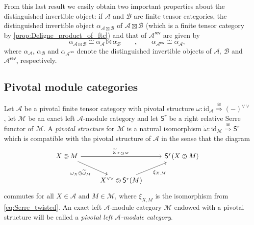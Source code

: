 \documentclass[11pt]{article}
\theoremstyle{definition}
\begin{document}
From this last result we easily obtain two important properties about the distinguished invertible object: if $\mathcal{A}$ and $\mathcal{B}$ are finite tensor categories, the distinguished invertible object $\alpha_{\mathcal{A} \boxtimes \mathcal{B}}$ of $\mathcal{A} \boxtimes \mathcal{B}$ (which is a finite tensor category by \cref{prop:Deligne_product_of_ftc}) and that of $\mathcal{A}^\mathsf{rev}$ are given by 
\begin{equation}\label{eq:disting_inv_for_Deligne_product}
\alpha_{\mathcal{A} \boxtimes \mathcal{B}} \cong \alpha_\mathcal{A} \boxtimes \alpha_\mathcal{B} \qquad , \qquad \alpha_{\mathcal{A}^\mathsf{rev}} \cong \alpha_\mathcal{A},
\end{equation}
where $\alpha_\mathcal{A}$, $\alpha_\mathcal{B}$ and $\alpha_{\mathcal{A}^\mathsf{rev}}$ denote the distinguished invertible objects of $\mathcal{A}$, $\mathcal{B}$ and  $\mathcal{A}^\mathsf{rev}$, respectively.


\subsection{Pivotal module categories}

Let $\mathcal{A}$ be a pivotal finite tensor category with pivotal structure $\omega: \mathrm{id}_\mathcal{A} \overset{\cong}{\Longrightarrow} (-)^{\vee \vee}$, let $\mathcal{M}$ be an exact left $\mathcal{A}$-module category and let $\mathsf{S}^r$ be a right relative Serre functor of $\mathcal{M}$. A \emph{pivotal structure} for $\mathcal{M}$ is a natural isomorphism $\widetilde{\omega}: \mathrm{id}_\mathcal{M} \overset{\cong}{\Longrightarrow} \mathsf{S}^r$ which is compatible with the pivotal structure of $\mathcal{A}$ in the sense that the diagram
\begin{equation}\label{eq:diagram_pmc}
\begin{tikzcd}
X \ogreaterthan M \arrow{rr}{\widetilde{\omega}_{X \ogreaterthan M}} \arrow{dr}[swap]{\omega_X \ogreaterthan  \widetilde{\omega}_{ M}} && \mathsf{S}^r(X \ogreaterthan M)\\
&   X^{\vee \vee} \ogreaterthan \mathsf{S}^r(M)  \arrow{ur}[swap]{\xi_{X,M}}  &
\end{tikzcd}
\end{equation}
commutes for all $X\in \mathcal{A}$ and $M \in \mathcal{M}$, where $\xi_{X,M}$ is the isomorphism from \eqref{eq:Serre_twisted}. An exact  left $\mathcal{A}$-module category $\mathcal{M}$ endowed with a pivotal structure will be called a \emph{pivotal left $\mathcal{A}$-module category}.
\end{document}
